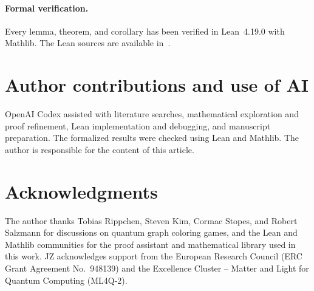 \documentclass[11pt,a4paper]{article}
\numberwithin{equation}{section}
\numberwithin{figure}{section}
\numberwithin{table}{section}
\numberwithin{footnote}{section}
\theoremstyle{informal}\newtheorem*{informaltheorem}{Informal theorem}
\theoremstyle{definition}\newtheorem{example}{Example}[section]
\theoremstyle{remark}\newtheorem{remark}[theorem]{Remark}
\begin{document}
\paragraph{Formal verification.}
Every lemma, theorem, and corollary has been verified in Lean~4.19.0
with Mathlib. The Lean sources are available in~\cite{zeiss-lean}.

\section*{Author contributions and use of AI}
OpenAI Codex assisted with literature searches, mathematical exploration
and proof refinement, Lean implementation and debugging, and manuscript
preparation. The formalized results were checked using Lean and Mathlib.
The author is responsible for the content of this article.

\section*{Acknowledgments}
The author thanks Tobias Rippchen, Steven Kim, Cormac Stopes, and
Robert Salzmann for discussions on quantum graph coloring games,
and the Lean and Mathlib communities for the proof
assistant and mathematical library used in this work.
JZ acknowledges support from the European Research Council
(ERC Grant Agreement No.~948139) and the Excellence Cluster --
Matter and Light for Quantum Computing (ML4Q-2).
\end{document}
